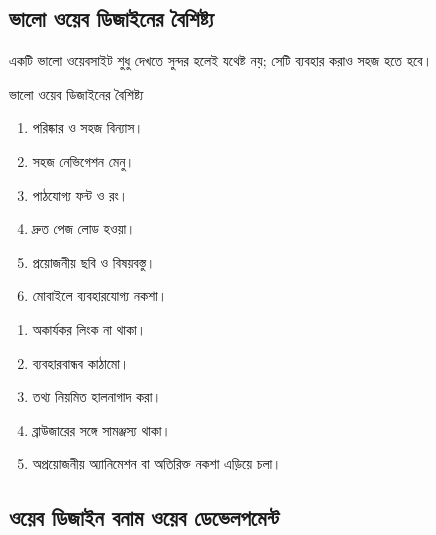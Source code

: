 \subsection{ভালো ওয়েব ডিজাইনের বৈশিষ্ট্য}

একটি ভালো ওয়েবসাইট শুধু দেখতে সুন্দর হলেই যথেষ্ট নয়; সেটি ব্যবহার করাও সহজ হতে হবে।

\begin{keypointbox}{ভালো ওয়েব ডিজাইনের বৈশিষ্ট্য}
\par\noindent
\begin{minipage}[t]{.48\linewidth}\vspace{0pt}
\begin{enumerate}
\item পরিষ্কার ও সহজ বিন্যাস।
\item সহজ নেভিগেশন মেনু।
\item পাঠযোগ্য ফন্ট ও রং।
\item দ্রুত পেজ লোড হওয়া।
\item প্রয়োজনীয় ছবি ও বিষয়বস্তু।
\item মোবাইলে ব্যবহারযোগ্য নকশা।
\end{enumerate}
\end{minipage}\hfill
\begin{minipage}[t]{.48\linewidth}\vspace{0pt}
\begin{enumerate}[start=7]
\item অকার্যকর লিংক না থাকা।
\item ব্যবহারবান্ধব কাঠামো।
\item তথ্য নিয়মিত হালনাগাদ করা।
\item ব্রাউজারের সঙ্গে সামঞ্জস্য থাকা।
\item অপ্রয়োজনীয় অ্যানিমেশন বা অতিরিক্ত নকশা এড়িয়ে চলা।
\end{enumerate}
\end{minipage}\par

\end{keypointbox}



\subsection{ওয়েব ডিজাইন বনাম ওয়েব ডেভেলপমেন্ট}

